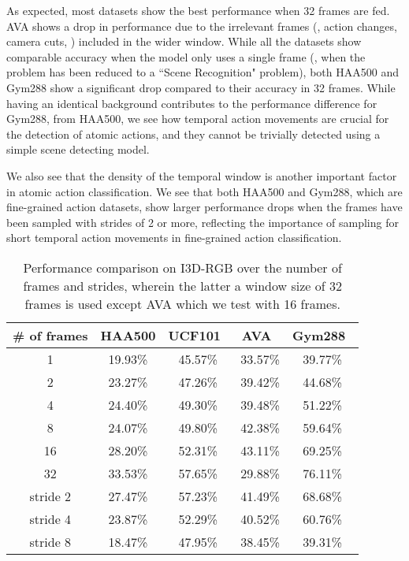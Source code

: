 \documentclass[10pt,twocolumn,letterpaper]{article}
\begin{document}
As expected, most datasets show the best performance when 32 frames are fed. AVA shows a drop in performance due to the irrelevant frames (\eg, action changes, camera cuts, \etc) included in the wider window. While all the datasets show comparable accuracy when the model only uses a single frame (\ie, when the problem has been reduced to a  ``Scene Recognition" problem), both HAA500 and Gym288 show a significant drop compared to their accuracy in 32 frames. While having an identical background contributes to the performance difference for Gym288, from HAA500, we see how temporal action movements are crucial for the detection of atomic actions, and they cannot be trivially detected using a simple scene detecting model. 

We also see that the density of the temporal window is another important factor in atomic action classification. We see that both HAA500 and Gym288, which are fine-grained action datasets, show larger performance drops when the frames have been sampled with strides of 2 or more, reflecting the importance of sampling for short temporal action movements in fine-grained action classification.

\begin{table}[t]
{\small 
\begin{center}
\begin{tabular}{c|c|c|c|c}
\hline
 \# of frames & HAA500 & UCF101~\cite{ucf101} & AVA~\cite{AVA} & Gym288~\cite{finegym} \\
\hline
1  & 19.93\% & 45.57\% & 33.57\% & 39.77\%\\
2  & 23.27\% & 47.26\% & 39.42\% & 44.68\%\\
4  & 24.40\% & 49.30\% & 39.48\% & 51.22\%\\
8  & 24.07\% & 49.80\% & 42.38\% & 59.64\%\\
16 & 28.20\% & 52.31\% & 43.11\% & 69.25\% \\
32 & 33.53\% & 57.65\% & 29.88\% & 76.11\% \\
\hline
stride 2 & 27.47\% & 57.23\%  & 41.49\% & 68.68\%\\
stride 4 & 23.87\% & 52.29\%  & 40.52\% & 60.76\%\\
stride 8 & 18.47\% & 47.95\%  & 38.45\% & 39.31\%\\
\hline
\end{tabular}
\end{center}}
\vspace{-0.1in}
\caption{Performance comparison on I3D-RGB over the number of frames and strides, wherein the latter a window size of 32 frames is used except AVA which we test with 16 frames.}
\label{table:action_oriented}
\vspace{-0in}
\end{table}
\end{document}
